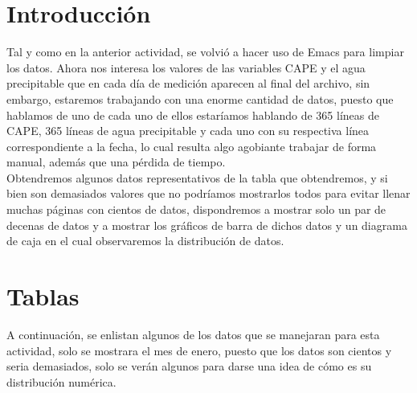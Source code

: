 \documentclass[a4paper,12pt]{article}
\begin{document}
\section{Introducción}
\noindent
Tal y como en la anterior actividad, se volvió a hacer uso de Emacs para limpiar los datos. Ahora nos interesa los valores de las variables CAPE y el agua precipitable que en cada día de medición aparecen al final del archivo, sin embargo, estaremos trabajando con una enorme cantidad de datos, puesto que hablamos de uno de cada uno de ellos estaríamos hablando de 365 líneas de CAPE, 365 líneas de agua precipitable y cada uno con su respectiva línea correspondiente a la fecha, lo cual resulta algo agobiante trabajar de forma manual, además que una pérdida de tiempo. \\

\noindent
Obtendremos algunos datos representativos de la tabla que obtendremos, y si bien son demasiados valores que no podríamos mostrarlos todos para evitar llenar muchas páginas con cientos de datos, dispondremos a mostrar solo un par de decenas de datos y a mostrar los gráficos de barra de dichos datos y un diagrama de caja en el cual observaremos la distribución de datos.

\newpage
\section{Tablas}
\noindent
A continuación, se enlistan algunos de los datos que se manejaran para esta actividad, solo se mostrara el mes de enero, puesto que los datos son cientos y seria demasiados, solo se verán algunos para darse una idea de cómo es su distribución numérica.
\end{document}
